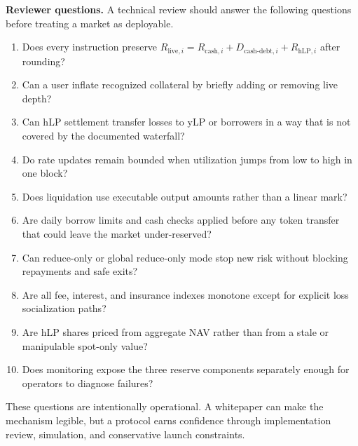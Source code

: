 \documentclass[11pt]{article}
\newcommand{\cash}{\mathrm{cash}}
\newcommand{\live}{\mathrm{live}}
\newcommand{\hlp}{\mathrm{hLP}}
\newcommand{\debt}{\mathrm{debt}}
\begin{document}
\textbf{Reviewer questions.} A technical review should answer the following questions before treating a market as deployable.
\begin{enumerate}
  \item Does every instruction preserve $R_{\live,i}=R_{\cash,i}+D_{\cash\text{-}\debt,i}+R_{\hlp,i}$ after rounding?
  \item Can a user inflate recognized collateral by briefly adding or removing live depth?
  \item Can hLP settlement transfer losses to yLP or borrowers in a way that is not covered by the documented waterfall?
  \item Do rate updates remain bounded when utilization jumps from low to high in one block?
  \item Does liquidation use executable output amounts rather than a linear mark?
  \item Are daily borrow limits and cash checks applied before any token transfer that could leave the market under-reserved?
  \item Can reduce-only or global reduce-only mode stop new risk without blocking repayments and safe exits?
  \item Are all fee, interest, and insurance indexes monotone except for explicit loss socialization paths?
  \item Are hLP shares priced from aggregate NAV rather than from a stale or manipulable spot-only value?
  \item Does monitoring expose the three reserve components separately enough for operators to diagnose failures?
\end{enumerate}

These questions are intentionally operational. A whitepaper can make the mechanism legible, but a protocol earns confidence through implementation review, simulation, and conservative launch constraints.



\end{document}
